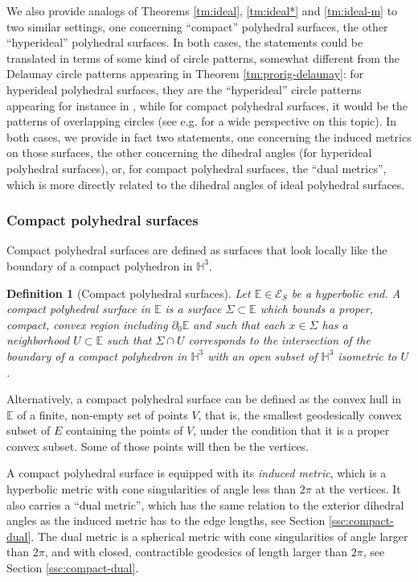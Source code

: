 \documentclass[notitlepage,twoside,a4paper]{amsart}
\newtheorem{definition}[theorem]{\rm\bf Definition}
\theoremstyle{named}
\newcommand{\HH}{{\mathbb H}}
\newcommand{\bE}{{\mathbb E}}
\newcommand{\cE}{{\mathcal E}}
\begin{document}
We also provide analogs of Theorems \ref{tm:ideal}, \ref{tm:ideal*} and \ref{tm:ideal-m} to two similar settings, one concerning ``compact'' polyhedral surfaces, the other ``hyperideal'' polyhedral surfaces. In both cases, the statements could be translated in terms of some kind of circle patterns, somewhat different from the Delaunay circle patterns appearing in Theorem \ref{tm:prorig-delaunay}: for hyperideal polyhedral surfaces, they are the ``hyperideal'' circle patterns appearing for instance in \cite{hcp,springborn-hcp,bobenko-lutz}, while for compact polyhedral surfaces, it would be the patterns of overlapping circles (see e.g. \cite{bowers:combinatorics} for a wide perspective on this topic). In both cases, we provide in fact two statements, one concerning the induced metrics on those surfaces, the other concerning the dihedral angles (for hyperideal polyhedral surfaces), or, for compact polyhedral surfaces, the ``dual metrics'', which is more directly related to the dihedral angles of ideal polyhedral surfaces.

\subsubsection{Compact polyhedral surfaces}

Compact polyhedral surfaces are defined as surfaces that look locally like the boundary of a compact polyhedron in $\HH^3$.

\begin{definition}[Compact polyhedral surfaces] \label{df:polycompact}
  Let $\bE\in \cE_S$ be a hyperbolic end. A {\em compact polyhedral surface} in $\bE$ is a surface $\Sigma\subset \bE$ which bounds a proper, compact, convex region including $\partial_0\bE$ and such that each $x\in \Sigma$ has a neighborhood $U\subset \bE$ such that $\Sigma\cap U$ corresponds to the intersection of the boundary of a compact polyhedron in $\HH^3$ with an open subset of $\HH^3$ isometric to $U$.
\end{definition}

Alternatively, a compact polyhedral surface can be defined as the convex hull in $\bE$ of a finite, non-empty set of points $V$, that is, the smallest geodesically convex subset of $E$ containing the points of $V$, under the condition that it is a proper convex subset. Some of those points will then be the vertices.

A compact polyhedral surface is equipped with its {\em induced metric}, which is a hyperbolic metric with cone singularities of angle less than $2\pi$ at the vertices. It also carries a ``dual metric'', which has the same relation to the exterior dihedral angles as the induced metric has to the edge lengths, see Section \ref{ssc:compact-dual}. The dual metric is a spherical metric with cone singularities of angle larger than $2\pi$, and with closed, contractible geodesics of length larger than $2\pi$, see Section \ref{ssc:compact-dual}.
\end{document}
